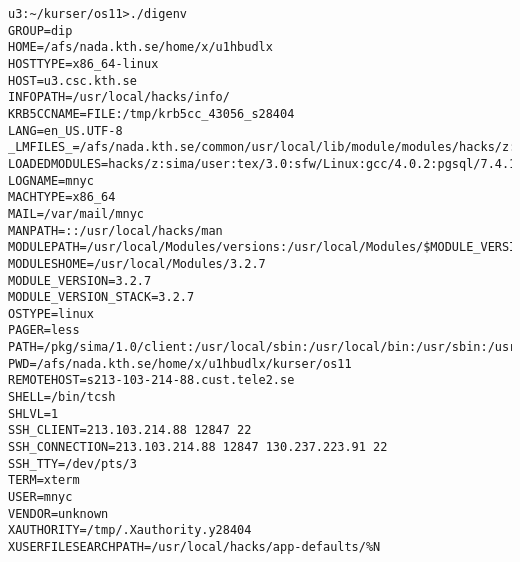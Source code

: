 \lstset{breaklines=true}
\begin{lstlisting}
u3:~/kurser/os11>./digenv 
GROUP=dip
HOME=/afs/nada.kth.se/home/x/u1hbudlx
HOSTTYPE=x86_64-linux
HOST=u3.csc.kth.se
INFOPATH=/usr/local/hacks/info/
KRB5CCNAME=FILE:/tmp/krb5cc_43056_s28404
LANG=en_US.UTF-8
_LMFILES_=/afs/nada.kth.se/common/usr/local/lib/module/modules/hacks/z:/afs/nada.kth.se/common/usr/local/lib/module/modules/sima/user:/afs/nada.kth.se/common/usr/local/lib/module/modules/tex/3.0:/afs/nada.kth.se/common/usr/local/lib/module/modules/sfw/Linux:/afs/nada.kth.se/common/usr/local/lib/module/modules/gcc/4.0.2:/afs/nada.kth.se/common/usr/local/lib/module/modules/pgsql/7.4.16
LOADEDMODULES=hacks/z:sima/user:tex/3.0:sfw/Linux:gcc/4.0.2:pgsql/7.4.16
LOGNAME=mnyc
MACHTYPE=x86_64
MAIL=/var/mail/mnyc
MANPATH=::/usr/local/hacks/man
MODULEPATH=/usr/local/Modules/versions:/usr/local/Modules/$MODULE_VERSION/modulefiles:/afs/nada.kth.se/common/usr/local/lib/module/modules:/usr/local/hacks/common/modules
MODULESHOME=/usr/local/Modules/3.2.7
MODULE_VERSION=3.2.7
MODULE_VERSION_STACK=3.2.7
OSTYPE=linux
PAGER=less
PATH=/pkg/sima/1.0/client:/usr/local/sbin:/usr/local/bin:/usr/sbin:/usr/bin:/sbin:/bin:/usr/games:/usr/local/hacks/bin
PWD=/afs/nada.kth.se/home/x/u1hbudlx/kurser/os11
REMOTEHOST=s213-103-214-88.cust.tele2.se
SHELL=/bin/tcsh
SHLVL=1
SSH_CLIENT=213.103.214.88 12847 22
SSH_CONNECTION=213.103.214.88 12847 130.237.223.91 22
SSH_TTY=/dev/pts/3
TERM=xterm
USER=mnyc
VENDOR=unknown
XAUTHORITY=/tmp/.Xauthority.y28404
XUSERFILESEARCHPATH=/usr/local/hacks/app-defaults/%N
\end{lstlisting}